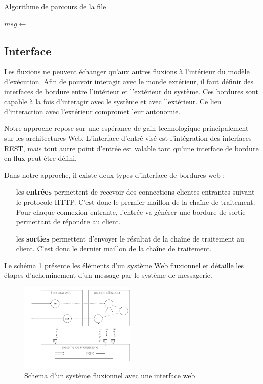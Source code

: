 \begin{algorithm}
\caption{Algorithme de parcours de la file}
\label{alg:parcours}
\begin{algorithmic}
\State $msg \gets$ 
\State {}
\EndWhile
\EndWhile
\end{algorithmic}
\end{algorithm}

\subsection{Interface}

Les fluxions ne peuvent échanger qu'aux autres fluxions à l'intérieur du modèle d'exécution.
Afin de pouvoir interagir avec le monde extérieur, il faut définir des interfaces de bordure entre l'intérieur et l'extérieur du système. Ces bordures sont capable à la fois d'interagir avec le système et avec l'extérieur.
Ce lien d'interaction avec l'extérieur compromet leur autonomie.


Notre approche repose sur une espérance de gain technologique principalement sur les architectures Web.
L'interface d'entré visé est l'intégration des interfaces REST, mais tout autre point d'entrée est valable tant qu'une interface de bordure en flux peut être défini.

Dans notre approche, il existe deux types d'interface de bordures web :

\begin{itemize}
	\item[les \textbf{entrées}]
    permettent de recevoir des connections clientes entrantes suivant le protocole HTTP.
    C'est donc le premier maillon de la chaîne de traitement.
    Pour chaque connexion entrante, l'entrée va générer une bordure de sortie permettant de répondre au client.
	\item[les \textbf{sorties}]
    permettent d'envoyer le résultat de la chaîne de traitement au client.
    C'est donc le dernier maillon de la chaîne de traitement.
\end{itemize}


Le schéma \ref{fig:schemaweb} présente les éléments d'un système Web fluxionnel et détaille les étapes d'acheminement d'un message par le système de messagerie.

\begin{figure}[h!]
	\includegraphics[width=0.5\textwidth]{schema-web.pdf}
	\caption{Schema d'un système fluxionnel avec une interface web}
	\label{fig:schemaweb}
\end{figure}

